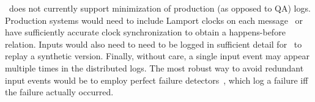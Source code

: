 

 \projectname~does
not currently support minimization of production (as opposed
to QA) logs. Production systems would need to include Lamport
clocks on each message~\cite{Lamport:1978:TCO:359545.359563} or have
sufficiently accurate clock synchronization to obtain a happens-before
relation. Inputs would also
need to need to be logged in sufficient detail for \projectname~to
replay a synthetic version. Finally, without care, a single
input event may appear multiple times in the
distributed logs. The most robust way to
avoid redundant input events would be to employ perfect failure
detectors~\cite{chandra1996unreliable}, which log a failure iff
the failure actually occurred.


